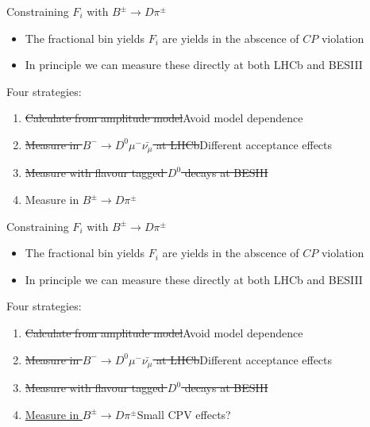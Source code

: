 \documentclass{beamer}
\begin{document}
\begin{frame}{Constraining $F_i$ with $B^\pm\to D\pi^\pm$}
  \begin{itemize}
    \setlength\itemsep{1.0em}
    \item{The fractional bin yields $F_i$ are yields in the abscence of $C\!P$ violation}
    \item{In principle we can measure these directly at both LHCb and BESIII}
  \end{itemize}
  \begin{center}
    Four strategies:
  \end{center}
  \begin{enumerate}
    \setlength\itemsep{1.0em}
    \item{\sout{Calculate from amplitude model}\quad Avoid model dependence}
    \item{\sout{Measure in $B^-\to D^0\mu^-\bar{\nu_\mu}$ at LHCb}\quad Different acceptance effects}
    \item{\sout{Measure with flavour tagged $D^0$ decays at BESIII}}
    \item{Measure in $B^\pm\to D\pi^\pm$}
  \end{enumerate}
  \vspace{0.1cm}
  \begin{center}
  \end{center}
\end{frame}

\begin{frame}{Constraining $F_i$ with $B^\pm\to D\pi^\pm$}
  \begin{itemize}
    \setlength\itemsep{1.0em}
    \item{The fractional bin yields $F_i$ are yields in the abscence of $C\!P$ violation}
    \item{In principle we can measure these directly at both LHCb and BESIII}
  \end{itemize}
  \begin{center}
    Four strategies:
  \end{center}
  \begin{enumerate}
    \setlength\itemsep{1.0em}
    \item{\sout{Calculate from amplitude model}\quad Avoid model dependence}
    \item{\sout{Measure in $B^-\to D^0\mu^-\bar{\nu_\mu}$ at LHCb}\quad Different acceptance effects}
    \item{\sout{Measure with flavour tagged $D^0$ decays at BESIII}}
    \item{\underline{Measure in $B^\pm\to D\pi^\pm$}\quad Small CPV effects?}
  \end{enumerate}
  \vspace{0.1cm}
  \begin{center}
  \end{center}
\end{frame}
\end{document}
